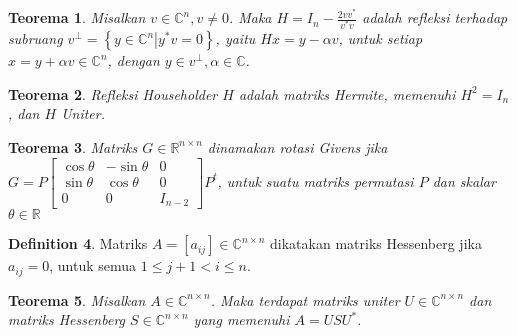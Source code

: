 \documentclass[11pt,a4paper]{article}
\newcommand{\ds}{\displaystyle}
\theoremstyle{plain}
\newtheorem{theorem}{Teorema}[section]
\theoremstyle{definition}
\newtheorem{defn}[theorem]{Definition}
\theoremstyle{remark}
\begin{document}
\begin{enumerate}
	\begin{bfseries}
		\begin{theorem}
			Misalkan $v\in \mathbb{C}^{n}, v\ne 0$. Maka $\ds H=I_{n}-\frac{2vv^{\ast}}{v^{\ast}v}$ adalah refleksi terhadap subruang $v^{\bot}=\left\{ \left. y\in \mathbb{C}^{n} \right|  y^{\ast}v=0\right\}$, yaitu $Hx=y-\alpha v$, untuk setiap $x=y+\alpha v \in \mathbb{C}^{n}$, dengan $y\in v^{\bot}, \alpha \in \mathbb{C}$.
		\end{theorem}
	\end{bfseries}

	\begin{bfseries}
		\begin{theorem}
			Refleksi Householder $H$ adalah matriks Hermite, memenuhi $H^{2}=I_{n}$, dan $H$ Uniter.
		\end{theorem}
	\end{bfseries}

	\begin{bfseries}
		\begin{theorem}
			Matriks $G\in \mathbb{R}^{n\times n}$ dinamakan rotasi Givens jika $G=P \begin{bmatrix}
			\cos \theta & -\sin \theta & 0 \\
			\sin \theta & \cos \theta & 0 \\
			0 & 0 & I_{n-2}
			\end{bmatrix} P^{t}$, untuk suatu matriks permutasi $P$ dan skalar $\theta \in \mathbb{R}$
		\end{theorem}
	\end{bfseries}

	\begin{bfseries}
		\begin{defn}
			Matriks $A=[a_{ij}]\in \mathbb{C}^{n\times n}$ dikatakan matriks Hessenberg jika $a_{ij}=0$, untuk semua $1\leq j+1< i\leq n$.
		\end{defn}
	\end{bfseries}

	\begin{bfseries}
		\begin{theorem}
			Misalkan $A\in \mathbb{C}^{n\times n}$. Maka terdapat matriks uniter $U\in \mathbb{C}^{n\times n}$ dan matriks Hessenberg $S\in \mathbb{C}^{n\times n}$ yang memenuhi $A=USU^{\ast}$.
		\end{theorem}
	\end{bfseries}


\end{enumerate}
\end{document}
